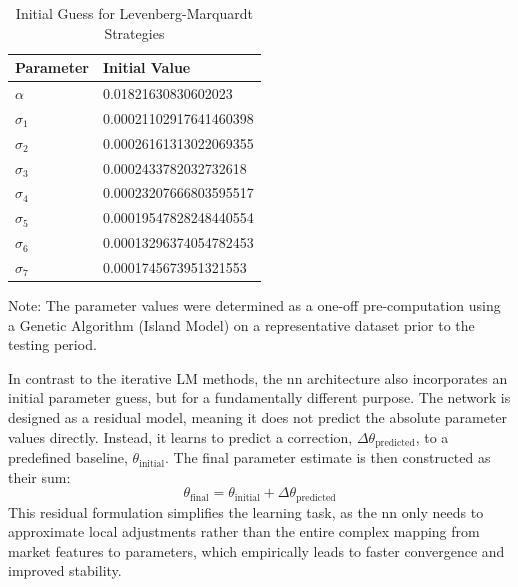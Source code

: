 \begin{table}[H]
	\centering
	\begin{threeparttable}
		\caption{Initial Guess for Levenberg-Marquardt Strategies}
		\label{tab:initial_guess}
		\begin{tabular}{ll}
			\toprule
			Parameter  & Initial Value          \\
			\midrule
			$\alpha$   & 0.01821630830602023    \\
			\addlinespace
			$\sigma_1$ & 0.00021102917641460398 \\
			$\sigma_2$ & 0.00026161313022069355 \\
			$\sigma_3$ & 0.0002433782032732618  \\
			$\sigma_4$ & 0.00023207666803595517 \\
			$\sigma_5$ & 0.00019547828248440554 \\
			$\sigma_6$ & 0.00013296374054782453 \\
			$\sigma_7$ & 0.0001745673951321553  \\
			\bottomrule
		\end{tabular}
		\begin{tablenotes}
			\item \footnotesize Note: The parameter values were determined as a one-off pre-computation using a Genetic Algorithm (Island Model) on a representative dataset prior to the testing period.
		\end{tablenotes}
	\end{threeparttable}
\end{table}

In contrast to the iterative LM methods, the \ac{nn} architecture also incorporates an initial parameter guess, but for a fundamentally different purpose. The network is designed as a residual model, meaning it does not predict the absolute parameter values directly. Instead, it learns to predict a correction, $\Delta \theta_{\text{predicted}}$, to a predefined baseline, $\theta_{\text{initial}}$. The final parameter estimate is then constructed as their sum:
\begin{equation}
	\theta_{\text{final}} = \theta_{\text{initial}} + \Delta \theta_{\text{predicted}}
\end{equation}
This residual formulation simplifies the learning task, as the \ac{nn} only needs to approximate local adjustments rather than the entire complex mapping from market features to parameters, which empirically leads to faster convergence and improved stability.

